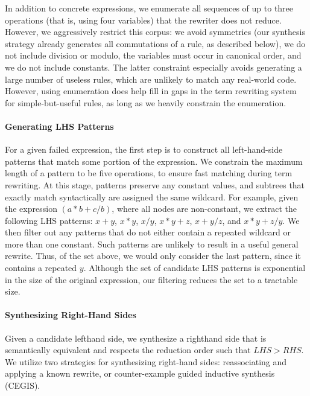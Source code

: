 \documentclass[sigplan,10pt,review,anonymous]{acmart}\settopmatter{printfolios=true,printccs=false,printacmref=false}
\begin{document}
In addition to concrete expressions, we enumerate all sequences of up to three operations (that is,
using four variables) that the rewriter does not reduce.  However, we aggressively restrict
this corpus: we avoid symmetries (our synthesis strategy already generates all commutations
of a rule, as described below), we do not include division or modulo, the variables must occur
in canonical order, and we do not include constants. The latter constraint
especially avoids generating a large number of useless rules, which are unlikely to
match any real-world code. However, using enumeration does help fill in gaps in the term
rewriting system for simple-but-useful rules, as long as we heavily constrain the enumeration.


\paragraph{Generating LHS Patterns} For a given failed expression, the first step
is to construct all left-hand-side patterns that match some portion of the expression.
We constrain the maximum length of a pattern to be five operations, to ensure fast matching
during term rewriting. At this stage, patterns preserve any constant values, and subtrees
that exactly match syntactically are assigned the same wildcard. For
example, given the expression $(a*b + c/b)$, where all nodes are non-constant,
we extract the following LHS patterns: $x + y$, $x * y$, $x / y$, $x * y + z$,
$x + y/z$, and $x*y + z/y$.  We then filter out any patterns that do not either contain
a repeated wildcard or more than one constant. Such patterns are unlikely to result in a useful general
rewrite.  Thus, of the set above, we would only consider the last pattern, since
it contains a repeated $y$.  Although the set of candidate LHS patterns is exponential
in the size of the original expression, our filtering reduces the set to a tractable
size.

\paragraph{Synthesizing Right-Hand Sides} Given a candidate lefthand side, we 
synthesize a righthand side that is semantically equivalent and respects the reduction
order such that $\mathit{LHS} > \mathit{RHS}$.  We utilize two strategies for synthesizing
right-hand sides: reassociating and applying a known rewrite, or counter-example guided
inductive synthesis (CEGIS).
\end{document}
